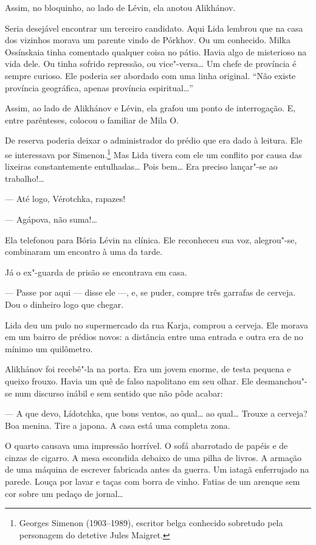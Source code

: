Assim, no bloquinho, ao lado de Lévin, ela anotou Alikhánov.

Seria desejável encontrar um terceiro candidato. Aqui Lida lembrou que
na casa dos vizinhos morava um parente vindo de Pórkhov. Ou um
conhecido. Milka Ossínskaia tinha comentado qualquer coisa no pátio.
Havia algo de misterioso na vida dele. Ou tinha sofrido repressão, ou
vice"-versa\ldots{} Um chefe de província é sempre curioso. Ele poderia ser
abordado com uma linha original. ``Não existe província geográfica,
apenas província espiritual\ldots{}''

Assim, ao lado de Alikhánov e Lévin, ela grafou um ponto de
interrogação. E, entre parênteses, colocou o familiar de Mila O.

De reserva poderia deixar o administrador do prédio que era dado à leitura. Ele
se interessava por Simenon.\footnote{Georges Simenon (1903--1989),
  escritor belga conhecido sobretudo pela personagem do detetive Jules
  Maigret.} Mas Lida tivera com ele um conflito por causa das lixeiras
constantemente entulhadas\ldots{} Pois bem\ldots{} Era preciso lançar"-se ao
trabalho!\ldots{}

--- Até logo, Vérotchka, rapazes!

--- Agápova, não suma!\ldots{}

Ela telefonou para Bória Lévin na clínica. Ele reconheceu sua voz,
alegrou"-se, combinaram um encontro à uma da tarde.

Já o ex"-guarda de prisão se encontrava em casa.

--- Passe por aqui --- disse ele ---, e, se puder, compre três garrafas
de cerveja. Dou o dinheiro logo que chegar.

Lida deu um pulo no supermercado da rua Karja, comprou a cerveja. Ele
morava em um bairro de prédios novos: a distância entre uma entrada e
outra era de no mínimo um quilômetro.

Alikhánov foi recebê"-la na porta. Era um jovem enorme, de testa pequena
e queixo frouxo. Havia um quê de falso napolitano em seu olhar. Ele
desmanchou"-se num discurso inábil e sem sentido que não pôde acabar:

--- A que devo, Lídotchka, que bons ventos, ao qual\ldots{} ao qual\ldots{} Trouxe
a cerveja? Boa menina. Tire a japona. A casa está uma completa zona.

O quarto causava uma impressão horrível. O sofá abarrotado de papéis e
de cinzas de cigarro. A mesa escondida debaixo de uma pilha de
livros. A armação de uma máquina de escrever fabricada antes da guerra.
Um iatagã enferrujado na parede. Louça por lavar e taças com borra de
vinho. Fatias de um arenque sem cor sobre um pedaço de jornal\ldots{}

